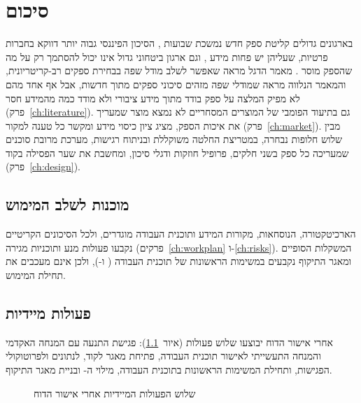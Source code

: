 \chapter{סיכום}\label{ch:summary}

בארגונים גדולים קליטת ספק חדש נמשכת שבועות \cite{hicx2021}, הסיכון הפיננסי גבוה יותר דווקא בחברות פרטיות, שעליהן יש פחות מידע \cite{rapidratings2026}, וגם ארגון ביטחוני גדול אינו יכול להסתמך רק על מה שהספק מוסר \cite{gao2025}. מאמר הדגל \cite{sadeghi2026} מראה שאפשר לשלב מודל שפה בבחירת ספקים רב-קריטריונית, והמאמר הנלווה \cite{zhao2025} מראה שמודלי שפה מזהים סיכוני ספקים מתוך חדשות, אבל אף אחד מהם לא מפיק המלצה על ספק בודד מתוך מידע ציבורי ולא מודד כמה מהמידע חסר (פרק~\ref{ch:literature}). גם בתיעוד הפומבי של המוצרים המסחריים לא נמצא מוצר שמעריך את איכות הספק, מציג ציון כיסוי מידע ומקשר כל טענה למקור (פרק~\ref{ch:market}). מבין שלוש חלופות נבחרה, במטריצת החלטה משוקללת ובניתוח רגישות, מערכת מרובת סוכנים שמעריכה כל ספק בשני חלקים, פרופיל חוזקות ודגלי סיכון, ומחשבת את שער הפסילה בקוד (פרק~\ref{ch:design}).

\section*{מוכנות לשלב המימוש}
הארכיטקטורה, הנוסחאות, מקורות המידע ותוכנית העבודה מוגדרים, ולכל הסיכונים הקריטיים נקבעו פעולות מנע ותוכניות מגירה (פרקים~\ref{ch:workplan} ו-\ref{ch:risks}). המשקלות הסופיים ומאגר התיקוף נקבעים במשימות הראשונות של תוכנית העבודה ( ו-), ולכן אינם מעכבים את תחילת המימוש.

\section*{פעולות מיידיות}
אחרי אישור הדוח יבוצעו שלוש פעולות (איור~\ref{fig:next}): פגישת התנעה עם המנחה האקדמי והמנחה התעשייתי לאישור תוכנית העבודה, פתיחת מאגר  לקוד, לנתונים ולפרוטוקולי הפגישות, ותחילת המשימות הראשונות בתוכנית העבודה, מילוי ה- ובניית מאגר התיקוף.

\begin{figure}[!h]
\centering
{}
\caption{שלוש הפעולות המיידיות אחרי אישור הדוח}\label{fig:next}
\end{figure}
